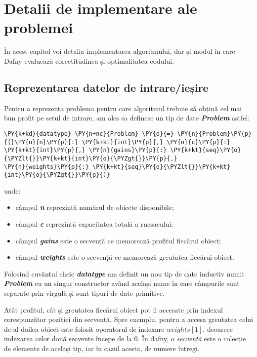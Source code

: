 \lstset{style=mylststyle}

\chapter{Detalii de implementare ale problemei}
\begin{sloppypar}
În acest capitol voi detalia implementarea algoritmului, dar și modul în care Dafny evaluează corectitudinea și optimalitatea codului. 

\section{Reprezentarea datelor de intrare/ieșire}

Pentru a reprezenta problema pentru care algoritmul trebuie să obțină cel mai bun profit pe setul de intrare, am ales sa definesc un tip de date \textbf{\textit{\textcolor{coleight}{Problem}}} astfel:

\begin{Verbatim}[commandchars=\\\{\}]
\PY{k+kd}{datatype} \PY{n+nc}{Problem} \PY{o}{=} \PY{n}{Problem}\PY{p}{(}\PY{n}{n}\PY{p}{:} \PY{k+kt}{int}\PY{p}{,} \PY{n}{c}\PY{p}{:} \PY{k+kt}{int}\PY{p}{,} \PY{n}{gains}\PY{p}{:} \PY{k+kt}{seq}\PY{o}{\PYZlt{}}\PY{k+kt}{int}\PY{o}{\PYZgt{}}\PY{p}{,} 
\PY{n}{weights}\PY{p}{:} \PY{k+kt}{seq}\PY{o}{\PYZlt{}}\PY{k+kt}{int}\PY{o}{\PYZgt{}}\PY{p}{)} 
\end{Verbatim}
unde:
\begin{itemize}
    \item câmpul \textit{\textbf{\textcolor{coleight}{n}}} reprezintă numărul de obiecte disponibile;
    \item câmpul \textit{\textbf{\textcolor{coleight}{c}}} reprezintă capacitatea totală a rucsacului;
    \item câmpul \textit{\textbf{\textcolor{coleight}{gains}}} este o secvență ce memorează profitul fiecărui obiect;
    \item câmpul \textit{\textbf{\textcolor{coleight}{weights}}} este o secvență ce memorează greutatea fiecărui obiect.
\end{itemize} \par
Folosind cuvântul cheie \textit{\textbf{\textcolor{coleight}{datatype}}} am definit un nou tip de date inductiv numit \textit{\textbf{\textcolor{coleight}{Problem}}} cu un singur constructor având același nume în care câmpurile sunt separate prin virgulă și sunt tipuri de date primitive.
\par
Atât profitul, cât și greutatea fiecărui obiect pot fi accesate prin indexul corespunzător poziției din secvență. Spre exemplu, pentru a accesa greutatea celui de-al doilea obiect este folosit operatorul de indexare $weights[1]$, deoarece indexarea celor două secvențe începe de la 0. În dafny, o \textit{secvență} este o colecție de elemente de același tip, iar în cazul acesta, de numere întregi. \\ \par


\end{sloppypar}
